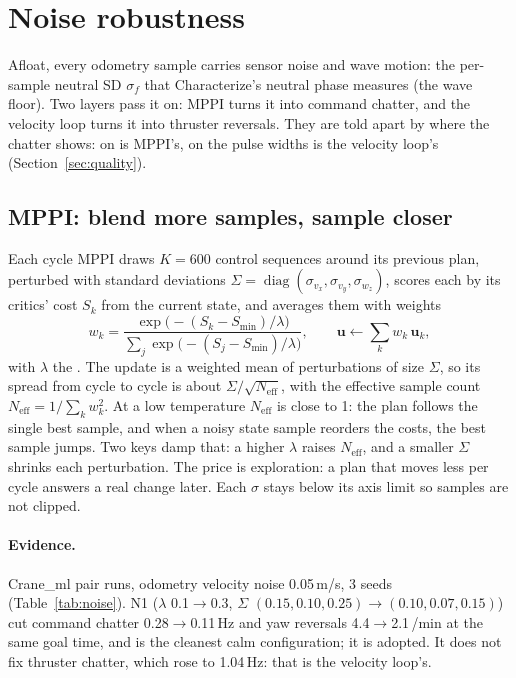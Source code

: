 \section{Noise robustness}
\label{sec:noise}

Afloat, every odometry sample carries sensor noise and wave motion: the per-sample neutral SD
$\sigma_f$ that Characterize's neutral phase measures (the wave floor). Two layers pass it on:
MPPI turns it into command chatter, and the velocity loop turns it into thruster reversals.
They are told apart by where the chatter shows:  on 
is MPPI's,  on the pulse widths is the velocity loop's
(Section~\ref{sec:quality}).

\subsection{MPPI: blend more samples, sample closer}
Each cycle MPPI draws $K = 600$ control sequences around its previous plan, perturbed with
standard deviations $\Sigma = \operatorname{diag}(\sigma_{v_x}, \sigma_{v_y}, \sigma_{w_z})$, scores
each by its critics' cost $S_k$ from the current state, and averages them with weights
\[
  w_k = \frac{\exp\!\big(-(S_k - S_\text{min})/\lambda\big)}{\sum_j \exp\!\big(-(S_j - S_\text{min})/\lambda\big)},
  \qquad \bm u \leftarrow \sum_k w_k\,\bm u_k ,
\]
with $\lambda$ the . The update is a weighted mean of perturbations of size
$\Sigma$, so its spread from cycle to cycle is about $\Sigma/\sqrt{N_\text{eff}}$, with the
effective sample count $N_\text{eff} = 1/\sum_k w_k^2$. At a low temperature $N_\text{eff}$ is
close to 1: the plan follows the single best sample, and when a noisy state sample reorders the
costs, the best sample jumps. Two keys damp that: a higher $\lambda$ raises $N_\text{eff}$, and a
smaller $\Sigma$ shrinks each perturbation. The price is exploration: a plan that moves less per
cycle answers a real change later. Each $\sigma$ stays below its axis limit so samples are not
clipped.

\paragraph{Evidence.} Crane\_ml pair runs, odometry velocity noise 0.05\,m/s, 3 seeds
(Table~\ref{tab:noise}). N1 ($\lambda$ 0.1$\to$0.3, $\Sigma$ $(0.15, 0.10, 0.25)\to(0.10, 0.07, 0.15)$)
cut command chatter 0.28$\to$0.11\,Hz and yaw reversals 4.4$\to$2.1\,/min at the same goal time,
and is the cleanest calm configuration; it is adopted. It does not fix thruster chatter, which
rose to 1.04\,Hz: that is the velocity loop's.

